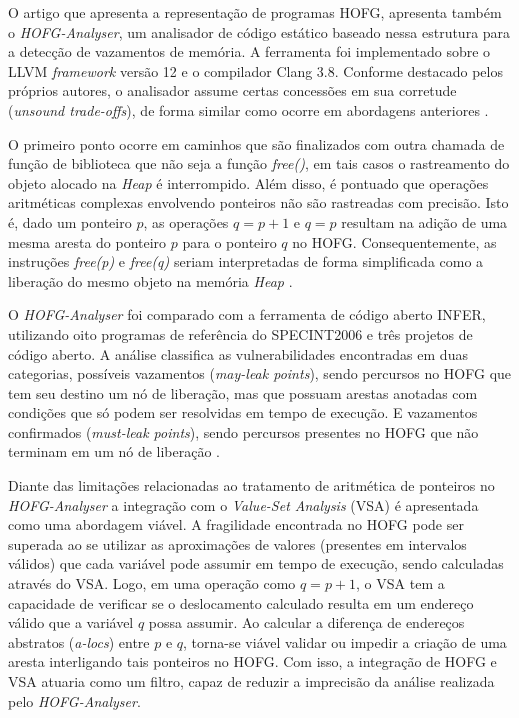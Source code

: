 \documentclass[
    12pt,                %
    openright,           %
    oneside,             %
    a4paper,             %
    english,             %
    brazil               %
]{abntex2}
\begin{document}
O artigo que apresenta a representação de programas HOFG, apresenta também o \textit{HOFG-Analyser}, um analisador de código estático baseado nessa estrutura para a detecção de vazamentos de memória. 
A ferramenta foi implementado sobre o LLVM \textit{framework} versão 12 e o compilador Clang 3.8. Conforme destacado pelos próprios autores, o analisador assume certas concessões em sua corretude (\textit{unsound trade-offs}), de forma similar como ocorre em abordagens anteriores \cite{MadhavC2023}.

\par
O primeiro ponto ocorre em caminhos que são finalizados com outra chamada de função de biblioteca que não seja a função \textit{free()}, em tais casos o rastreamento do objeto alocado na \textit{Heap} é interrompido. Além disso, é pontuado que operações aritméticas complexas envolvendo ponteiros não são rastreadas com precisão. 
Isto é, dado um ponteiro $p$, as operações $q=p+1$ e $q=p$ resultam na adição de uma mesma aresta do ponteiro $p$ para o ponteiro $q$ no HOFG. Consequentemente, as instruções \textit{free(p)} e \textit{free(q)} seriam interpretadas de forma simplificada como a liberação do mesmo objeto na memória \textit{Heap} \cite{MadhavC2023}.

\par
O \textit{HOFG-Analyser} foi comparado com a ferramenta de código aberto INFER, utilizando oito programas de referência do SPECINT2006 e três projetos de código aberto. A análise classifica as vulnerabilidades encontradas em duas categorias, possíveis vazamentos (\textit{may-leak points}), sendo percursos no HOFG que tem seu destino um nó de liberação, 
mas que possuam arestas anotadas com condições que só podem ser resolvidas em tempo de execução. E vazamentos confirmados (\textit{must-leak points}), sendo percursos presentes no HOFG que não terminam em um nó de liberação \cite{MadhavC2023}.

\par
Diante das limitações relacionadas ao tratamento de aritmética de ponteiros no \textit{HOFG-Analyser} a integração com o \textit{Value-Set Analysis} (VSA) é apresentada como uma abordagem viável. A fragilidade encontrada no HOFG pode ser superada ao se utilizar as aproximações de valores (presentes em intervalos válidos) que cada variável pode assumir em tempo de execução, 
sendo calculadas através do VSA. Logo, em uma operação como $q=p+1$, o VSA tem a capacidade de verificar se o deslocamento calculado resulta em um endereço válido que a variável $q$ possa assumir. Ao calcular a diferença de endereços abstratos (\textit{a-locs}) entre $p$ e $q$, torna-se viável validar ou impedir a criação de uma aresta interligando tais ponteiros no HOFG. 
Com isso, a integração de HOFG e VSA atuaria como um filtro, capaz de reduzir a imprecisão da análise realizada pelo \textit{HOFG-Analyser}.
\end{document}
